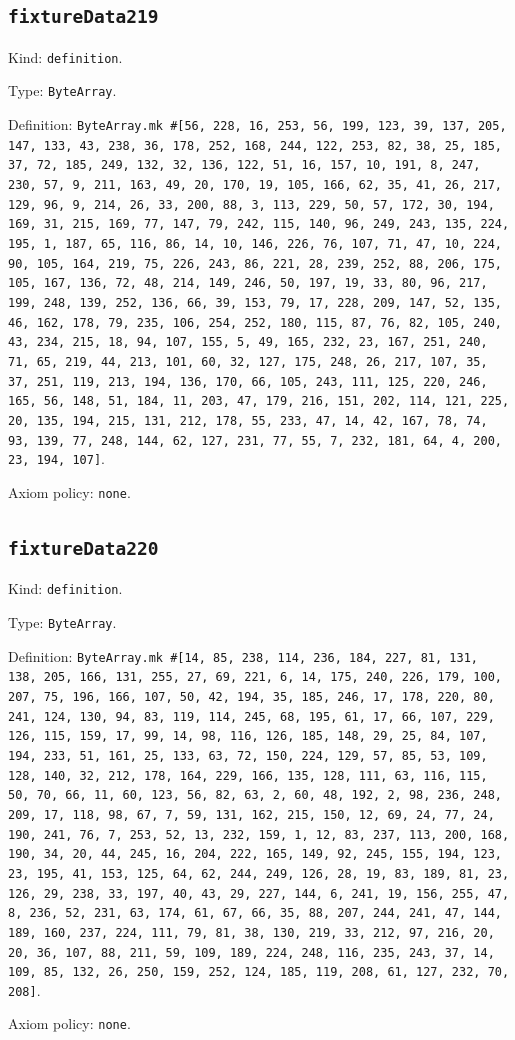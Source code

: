 \documentclass[11pt]{article}
\begin{document}
\subsection*{\texttt{fixtureData219}}
\noindent Kind: \texttt{definition}.\par
\noindent Type: \texttt{ByteArray}.\par
\noindent Definition: \texttt{ByteArray.mk \#[56, 228, 16, 253, 56, 199, 123, 39, 137, 205, 147, 133, 43, 238, 36, 178, 252, 168, 244, 122, 253, 82, 38, 25, 185, 37, 72, 185, 249, 132, 32, 136, 122, 51, 16, 157, 10, 191, 8, 247, 230, 57, 9, 211, 163, 49, 20, 170, 19, 105, 166, 62, 35, 41, 26, 217, 129, 96, 9, 214, 26, 33, 200, 88, 3, 113, 229, 50, 57, 172, 30, 194, 169, 31, 215, 169, 77, 147, 79, 242, 115, 140, 96, 249, 243, 135, 224, 195, 1, 187, 65, 116, 86, 14, 10, 146, 226, 76, 107, 71, 47, 10, 224, 90, 105, 164, 219, 75, 226, 243, 86, 221, 28, 239, 252, 88, 206, 175, 105, 167, 136, 72, 48, 214, 149, 246, 50, 197, 19, 33, 80, 96, 217, 199, 248, 139, 252, 136, 66, 39, 153, 79, 17, 228, 209, 147, 52, 135, 46, 162, 178, 79, 235, 106, 254, 252, 180, 115, 87, 76, 82, 105, 240, 43, 234, 215, 18, 94, 107, 155, 5, 49, 165, 232, 23, 167, 251, 240, 71, 65, 219, 44, 213, 101, 60, 32, 127, 175, 248, 26, 217, 107, 35, 37, 251, 119, 213, 194, 136, 170, 66, 105, 243, 111, 125, 220, 246, 165, 56, 148, 51, 184, 11, 203, 47, 179, 216, 151, 202, 114, 121, 225, 20, 135, 194, 215, 131, 212, 178, 55, 233, 47, 14, 42, 167, 78, 74, 93, 139, 77, 248, 144, 62, 127, 231, 77, 55, 7, 232, 181, 64, 4, 200, 23, 194, 107]}.\par
\noindent Axiom policy: \texttt{none}.\par
\subsection*{\texttt{fixtureData220}}
\noindent Kind: \texttt{definition}.\par
\noindent Type: \texttt{ByteArray}.\par
\noindent Definition: \texttt{ByteArray.mk \#[14, 85, 238, 114, 236, 184, 227, 81, 131, 138, 205, 166, 131, 255, 27, 69, 221, 6, 14, 175, 240, 226, 179, 100, 207, 75, 196, 166, 107, 50, 42, 194, 35, 185, 246, 17, 178, 220, 80, 241, 124, 130, 94, 83, 119, 114, 245, 68, 195, 61, 17, 66, 107, 229, 126, 115, 159, 17, 99, 14, 98, 116, 126, 185, 148, 29, 25, 84, 107, 194, 233, 51, 161, 25, 133, 63, 72, 150, 224, 129, 57, 85, 53, 109, 128, 140, 32, 212, 178, 164, 229, 166, 135, 128, 111, 63, 116, 115, 50, 70, 66, 11, 60, 123, 56, 82, 63, 2, 60, 48, 192, 2, 98, 236, 248, 209, 17, 118, 98, 67, 7, 59, 131, 162, 215, 150, 12, 69, 24, 77, 24, 190, 241, 76, 7, 253, 52, 13, 232, 159, 1, 12, 83, 237, 113, 200, 168, 190, 34, 20, 44, 245, 16, 204, 222, 165, 149, 92, 245, 155, 194, 123, 23, 195, 41, 153, 125, 64, 62, 244, 249, 126, 28, 19, 83, 189, 81, 23, 126, 29, 238, 33, 197, 40, 43, 29, 227, 144, 6, 241, 19, 156, 255, 47, 8, 236, 52, 231, 63, 174, 61, 67, 66, 35, 88, 207, 244, 241, 47, 144, 189, 160, 237, 224, 111, 79, 81, 38, 130, 219, 33, 212, 97, 216, 20, 20, 36, 107, 88, 211, 59, 109, 189, 224, 248, 116, 235, 243, 37, 14, 109, 85, 132, 26, 250, 159, 252, 124, 185, 119, 208, 61, 127, 232, 70, 208]}.\par
\noindent Axiom policy: \texttt{none}.\par
\end{document}
